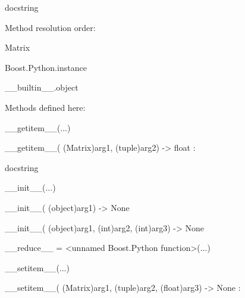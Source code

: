 \documentclass[letterpaper,10pt,english]{sphinxmanual}
\begin{document}
\begin{description}
\begin{description}
\item[{class Matrix(Boost.Python.instance)}] \leavevmode
\begin{DUlineblock}{0em}
\item[] docstring
\item[] 
\item[] Method resolution order:
\item[]
\begin{DUlineblock}{\DUlineblockindent}
\item[] Matrix
\item[] Boost.Python.instance
\item[] \_\_builtin\_\_.object
\item[] 
\end{DUlineblock}
\item[] Methods defined here:
\item[] 
\item[] \_\_getitem\_\_(...)
\item[]
\begin{DUlineblock}{\DUlineblockindent}
\item[] \_\_getitem\_\_( (Matrix)arg1, (tuple)arg2) -\textgreater{} float :
\item[]
\begin{DUlineblock}{\DUlineblockindent}
\item[] docstring
\item[] 
\end{DUlineblock}
\end{DUlineblock}
\item[] \_\_init\_\_(...)
\item[]
\begin{DUlineblock}{\DUlineblockindent}
\item[] \_\_init\_\_( (object)arg1) -\textgreater{} None
\item[] 
\item[] \_\_init\_\_( (object)arg1, (int)arg2, (int)arg3) -\textgreater{} None
\item[] 
\end{DUlineblock}
\item[] \_\_reduce\_\_ = \textless{}unnamed Boost.Python function\textgreater{}(...)
\item[] 
\item[] \_\_setitem\_\_(...)
\item[]
\begin{DUlineblock}{\DUlineblockindent}
\item[] \_\_setitem\_\_( (Matrix)arg1, (tuple)arg2, (float)arg3) -\textgreater{} None :

\end{DUlineblock}
\end{DUlineblock}
\end{description}
\end{description}
\end{document}
